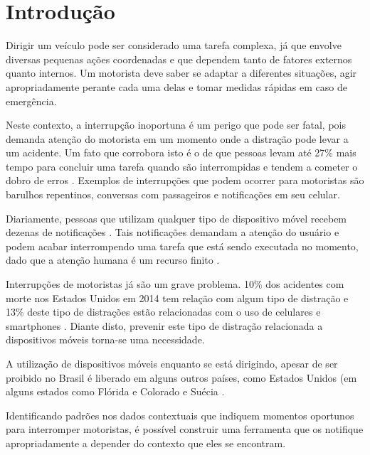 \chapter{Introdução}
\label{introducao}

Dirigir um veículo pode ser considerado uma tarefa complexa, já que envolve diversas pequenas ações coordenadas e
que dependem tanto de fatores externos quanto internos. Um motorista deve saber se adaptar a diferentes situações,
agir apropriadamente perante cada uma delas e tomar medidas rápidas em caso de emergência.

Neste contexto, a interrupção inoportuna é um perigo que pode ser fatal, pois demanda atenção do motorista em um momento
onde a distração pode levar a um acidente. Um fato que corrobora isto é o de que pessoas levam até 27\% mais tempo para
concluir uma tarefa quando são interrompidas e tendem a cometer o dobro de erros \cite{bailey2006need}. Exemplos de interrupções que podem
ocorrer para motoristas são barulhos repentinos, conversas com passageiros e notificações em seu celular.

Diariamente, pessoas que utilizam qualquer tipo de dispositivo móvel recebem dezenas de notificações \cite{pielot2014situ}. Tais notificações
demandam a atenção do usuário e podem acabar interrompendo uma tarefa que está sendo executada no momento, dado que a
atenção humana é um recurso finito \cite{simon1971designing}.

Interrupções de motoristas já são um grave problema. 10\% dos acidentes com morte nos Estados Unidos em 2014 tem relação
com algum tipo de distração e 13\% deste tipo de distrações estão relacionadas com o uso de celulares e smartphones \cite{distracted2014}.
Diante disto, prevenir este tipo de distração relacionada a dispositivos móveis torna-se uma necessidade.

A utilização de dispositivos móveis enquanto se está dirigindo, apesar de ser proibido no Brasil é liberado em alguns
outros países, como Estados Unidos (em alguns estados como Flórida e Colorado \cite{cellphoneuse} \cite{distracteddriving} e Suécia \cite{swedendrive}.

Identificando padrões nos dados contextuais que indiquem momentos oportunos para interromper motoristas, é possível
construir uma ferramenta que os notifique apropriadamente a depender do contexto que eles se encontram.
